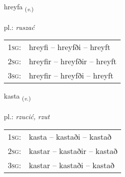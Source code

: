 \documentclass[frontgrid, backgrid]{flacards}\usepackage[]{graphicx}\usepackage[]{xcolor}
\begin{document}
\renewcommand{\blhead}{\vskip5pt {\small\bfseries\footnotesize Sagnorð | Verb }}
\renewcommand{\bcfoot}{\vskip5pt \hspace{2pt}{\small\bfseries\footnotesize 2K}}


{hreyfa \small{\textsubscript{(\textit{v.})}} \\[1ex] %
\textphonetic{[r̥eiːva]} \\
pl.: \emph{ruszać} \\  [2ex]
\renewcommand*{\arraystretch}{0.8}
\begin{tabular}{p{1cm}l}
\textsc{1sg}: & hreyfi -- hreyfði -- hreyft \\ 
\textsc{2sg}: & hreyfir -- hreyfðir -- hreyft \\ 
\textsc{3sg}: & hreyfir -- hreyfði -- hreyft \\ 
\end{tabular}
}

\renewcommand{\flhead}{\vskip5pt \fboxsep=0pt {\small\bfseries\footnotesize Sagnorð | Verb}}
\renewcommand{\fcfoot}{\vskip5pt \fboxsep=0pt \hspace{2pt}{\small\bfseries\footnotesize 2K}}

\renewcommand{\blhead}{\vskip5pt {\small\bfseries\footnotesize Sagnorð | Verb }}
\renewcommand{\bcfoot}{\vskip5pt \hspace{2pt}{\small\bfseries\footnotesize 2K}}


{kasta \small{\textsubscript{(\textit{v.})}} \\[1ex] %
\textphonetic{[kʰasta]} \\
pl.: \emph{rzucić, rzut} \\  [2ex]
\renewcommand*{\arraystretch}{0.8}
\begin{tabular}{p{1cm}l}
\textsc{1sg}: & kasta -- kastaði -- kastað \\ 
\textsc{2sg}: & kastar -- kastaðir -- kastað \\ 
\textsc{3sg}: & kastar -- kastaði -- kastað \\ 
\end{tabular}
}
\end{document}
